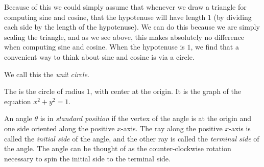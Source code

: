 \documentclass[nooutcomes]{ximera}
\begin{document}
Because of this we could simply assume that whenever we draw a triangle
for computing sine and cosine, that the hypotenuse will have length $1$ (by dividing each side by the length of the hypotenuse). 
We can do this because we are simply scaling the triangle, and as we see
above, this makes absolutely no difference when computing sine and
cosine. When the hypotenuse is $1$, we find that a convenient
way to think about sine and cosine is via a circle.
\begin{image}
\end{image}
We call this the \emph{unit circle}. 
\begin{definition}
	The  is the circle of radius $1$, with center at the origin. It is the graph of the equation $x^2 + y^2 = 1$.
\end{definition}

An angle $\theta$ is in \emph{standard position} if the vertex of the angle is at the origin and one side oriented along the positive $x$-axis. The ray along the positive $x$-axis is called the \emph{initial side} of the angle, and the
other ray is called the \emph{terminal side} of the angle. The angle can be thought of as the counter-clockwise rotation necessary to spin the initial side to the terminal side. 
\end{document}
